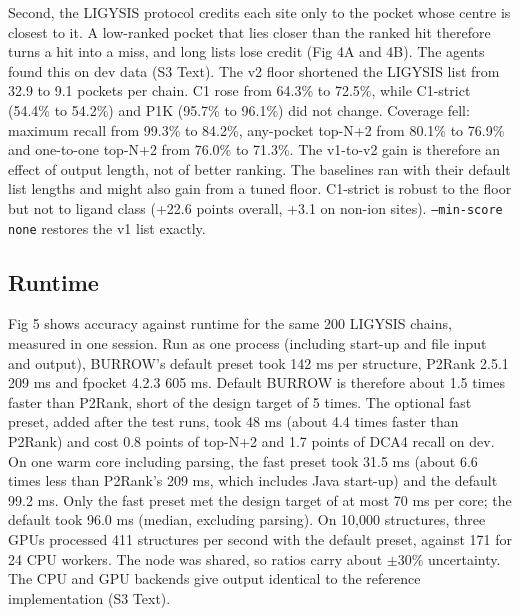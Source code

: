 \documentclass[10pt,letterpaper]{article}
\begin{document}
Second, the LIGYSIS protocol credits each site only to the pocket whose centre is closest to it. A low-ranked pocket that lies closer than the ranked hit therefore turns a hit into a miss, and long lists lose credit (Fig 4A and 4B). The agents found this on dev data (S3 Text). The v2 floor shortened the LIGYSIS list from 32.9 to 9.1 pockets per chain. C1 rose from 64.3\% to 72.5\%, while C1-strict (54.4\% to 54.2\%) and P1K (95.7\% to 96.1\%) did not change. Coverage fell: maximum recall from 99.3\% to 84.2\%, any-pocket top-N+2 from 80.1\% to 76.9\% and one-to-one top-N+2 from 76.0\% to 71.3\%. The v1-to-v2 gain is therefore an effect of output length, not of better ranking. The baselines ran with their default list lengths and might also gain from a tuned floor. C1-strict is robust to the floor but not to ligand class (+22.6 points overall, +3.1 on non-ion sites). \texttt{--min-score none} restores the v1 list exactly.

\subsection*{Runtime}

Fig 5 shows accuracy against runtime for the same 200 LIGYSIS chains, measured in one session. Run as one process (including start-up and file input and output), BURROW's default preset took 142 ms per structure, P2Rank 2.5.1 209 ms and fpocket 4.2.3 605 ms. Default BURROW is therefore about 1.5 times faster than P2Rank, short of the design target of 5 times. The optional fast preset, added after the test runs, took 48 ms (about 4.4 times faster than P2Rank) and cost 0.8 points of top-N+2 and 1.7 points of DCA4 recall on dev. On one warm core including parsing, the fast preset took 31.5 ms (about 6.6 times less than P2Rank's 209 ms, which includes Java start-up) and the default 99.2 ms. Only the fast preset met the design target of at most 70 ms per core; the default took 96.0 ms (median, excluding parsing). On 10,000 structures, three GPUs processed 411 structures per second with the default preset, against 171 for 24 CPU workers. The node was shared, so ratios carry about $\pm$30\% uncertainty. The CPU and GPU backends give output identical to the reference implementation (S3 Text).
\end{document}
